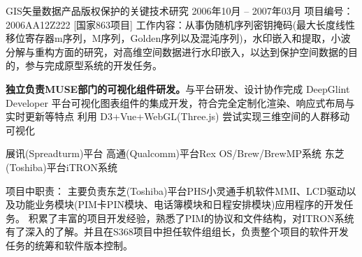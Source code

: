 \documentclass{resume}
\begin{document}
GIS矢量数据产品版权保护的关键技术研究				  				 	 2006年10月 – 2007年03月
项目编号：2006AA12Z222 [国家863项目]
工作内容：从事伪随机序列密钥掩码(最大长度线性移位寄存器m序列，M序列，Golden序列以及混沌序列)，水印嵌入和提取，小波分解与重构方面的研究，对高维空间数据进行水印嵌入，以达到保护空间数据的目的，参与完成原型系统的开发任务。



\textbf{独立负责MUSE部门的可视化组件研发。}与平台研发、设计协作完成 DeepGlint Developer 平台可视化图表组件的集成开发，符合完全定制化渲染、响应式布局与实时更新等特点
利用 D3+Vue+WebGL(Three.js) 尝试实现三维空间的人群移动可视化


展讯(Spreadturm)平台
高通(Qualcomm)平台Rex OS/Brew/BrewMP系统
东芝(Toshiba)平台iTRON系统

项目中职责： 
主要负责东芝(Toshiba)平台PHS小灵通手机软件MMI、LCD驱动以及功能业务模块(PIM卡PIN模块、电话簿模块和日程安排模块)应用程序的开发任务。
积累了丰富的项目开发经验，熟悉了PIM的协议和文件结构，对ITRON系统有了深入的了解。并且在S368项目中担任软件组组长，负责整个项目的软件开发任务的统筹和软件版本控制。














\begin{onehalfspacing}
\end{onehalfspacing}
\end{document}
